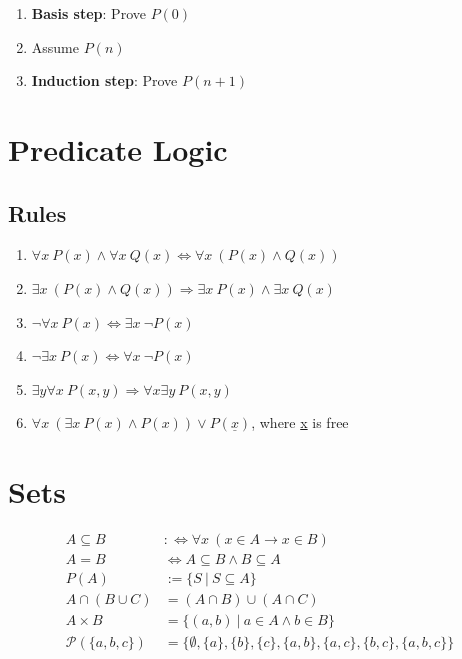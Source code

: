 \documentclass[11pt]{article}
\begin{document}
\begin{enumerate}
	\item \textbf{Basis step}: Prove $P(0)$
	\item Assume $P(n)$
	\item \textbf{Induction step}: Prove $P(n + 1)$
\end{enumerate}

\section{Predicate Logic}

\subsection{Rules}

\begin{enumerate}[labelindent=16pt,style=multiline,leftmargin=1.5cm, noitemsep]
	\item $\forall x\ P(x) \land \forall x\ Q(x) \Leftrightarrow \forall x\ (P(x) \land Q(x))$
	\item $\exists x\ (P(x) \land Q(x)) \Rightarrow \exists x\ P(x) \land \exists x\ Q(x)$
	\item $\neg\forall x\ P(x) \Leftrightarrow \exists x\ \neg P(x)$
	\item $\neg\exists x\ P(x) \Leftrightarrow \forall x \ \neg P(x)$
	\item $\exists y \forall x\ P(x, y) \Rightarrow \forall x \exists y\ P(x, y)$
	\item $\forall x\ (\exists x\ P(x) \land P(x)) \lor P(\underline{x})$, where \underline{x} is free
\end{enumerate}

\section{Sets}

\begin{equation*}
\begin{split}
	A \subseteq B & :\Leftrightarrow \forall x\ (x \in A \rightarrow x \in B) \\
	A = B & \Leftrightarrow A \subseteq B \land B \subseteq A \\
	P(A) & := \{S\ |\ S \subseteq A\} \\
	A \cap (B \cup C) & = (A \cap B) \cup (A \cap C) \\
	A \times B & = \{(a, b)\ |\ a \in A \land b \in B\} \\
	\mathcal{P}(\{a,b,c\}) & = \{\emptyset, \{a\}, \{b\}, \{c\}, \{a,b\}, \{a,c\}, \{b,c\}, \{a,b,c\}\}
\end{split}
\end{equation*}
\end{document}
